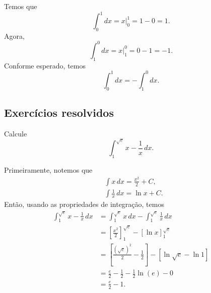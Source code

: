 \begin{ex}
  Temos que
  \begin{equation}
    \int_0^1 dx = \left. x\right|_0^1 = 1 - 0 = 1.
  \end{equation}
  Agora,
  \begin{equation}
    \int_1^0 dx = \left. x\right|_1^0 = 0 - 1 = -1.
  \end{equation}
  Conforme esperado, temos
  \begin{equation}
    \int_0^1 dx = - \int_1^0 dx.
  \end{equation}
\end{ex}

\subsection*{Exercícios resolvidos}

\begin{exeresol}
  Calcule
  \begin{equation}
    \int_1^{\sqrt{e}} x - \frac{1}{x}\,dx.
  \end{equation}
\end{exeresol}
\begin{resol}
  Primeiramente, notemos que
  \begin{align}
    & \int x\,dx = \frac{x^2}{2} + C,\\
    & \int \frac{1}{x}\,dx = \ln x + C.
  \end{align}
  Então, usando as propriedades de integração, temos
  \begin{align}
    \int_1^{\sqrt{e}} x - \frac{1}{x}\,dx &= \int_1^{\sqrt{e}} x\,dx - \int_1^{\sqrt{e}} \frac{1}{x}\,dx \\
                                 &= \left[\frac{x^2}{2}\right]_1^{\sqrt{e}} - \left[\ln x\right]_1^{\sqrt{e}} \\
                                          &= \left[\frac{(\sqrt{e})^2}{2} - \frac{1}{2}\right] - \left[\ln\sqrt{e} - \ln 1\right]\\
                                          &= \frac{e}{2} - \frac{1}{2} - \frac{1}{2}\ln(e) - 0 \\
                                          &= \frac{e}{2} - 1.
  \end{align}
\end{resol}

